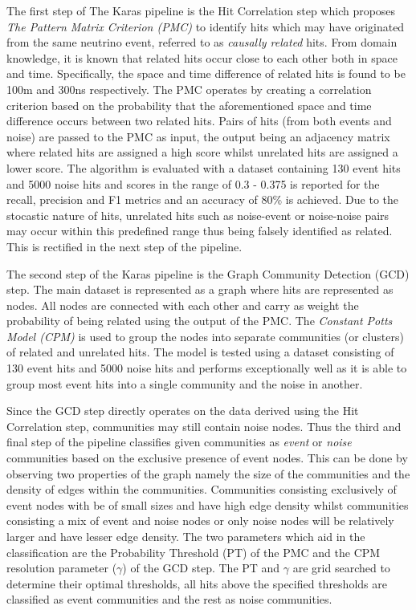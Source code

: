 The first step of The Karas pipeline is the Hit Correlation step which
proposes \emph{The Pattern Matrix Criterion (PMC)} to identify hits
which may have originated from the same neutrino event, referred to as
\emph{causally related} hits. From domain knowledge, it is known that
related hits occur close to each other both in space and time.
Specifically, the space and time difference of related hits is found
to be 100m and 300ns respectively. The PMC operates by creating a
correlation criterion based on the probability that the aforementioned
space and time difference occurs between two related hits. Pairs of
hits (from both events and noise) are passed to the PMC as input, the
output being an adjacency matrix where related hits are assigned a
high score whilst unrelated hits are assigned a lower score. The
algorithm is evaluated with a dataset containing 130 event hits and
5000 noise hits and scores in the range of 0.3 - 0.375 is reported for
the recall, precision and F1 metrics and an accuracy of 80\% is
achieved. Due to the stocastic nature of hits, unrelated hits such as
noise-event or noise-noise pairs may occur within this predefined
range thus being falsely identified as related. This is rectified in
the next step of the pipeline.

The second step of the Karas pipeline is the Graph Community Detection
(GCD) step. The main dataset is represented as a graph where hits are
represented as nodes. All nodes are connected with each other and
carry as weight the probability of being related using the output of
the PMC. The \emph{Constant Potts Model (CPM)} is used to group the
nodes into separate communities (or clusters) of related and unrelated
hits. The model is tested using a dataset consisting of 130 event hits
and 5000 noise hits and performs exceptionally well as it is able to
group most event hits into a single community and the noise in
another.

Since the GCD step directly operates on the data derived using the Hit
Correlation step, communities may still contain noise nodes. Thus the
third and final step of the pipeline classifies given communities as
\emph{event} or \emph{noise} communities based on the exclusive
presence of event nodes. This can be done by observing two properties
of the graph namely the size of the communities and the density of
edges within the communities. Communities consisting exclusively of
event nodes with be of small sizes and have high edge density whilst
communities consisting a mix of event and noise nodes or only noise
nodes will be relatively larger and have lesser edge density. The two
parameters which aid in the classification are the Probability
Threshold (PT) of the PMC and the CPM resolution parameter ($\gamma$)
of the GCD step. The PT and $\gamma$ are grid searched to determine
their optimal thresholds, all hits above the specified thresholds are
classified as event communities and the rest as noise communities.

